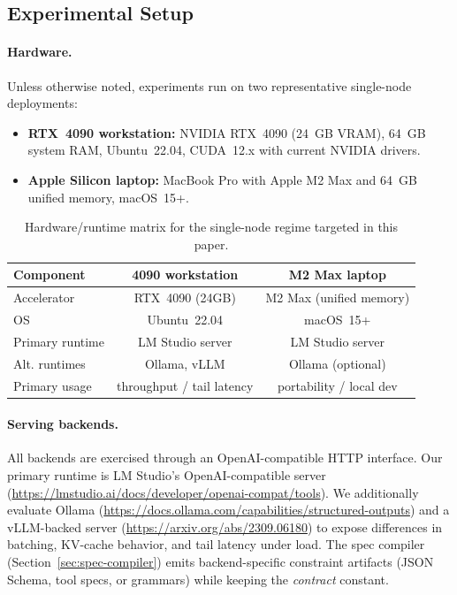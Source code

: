 \documentclass[11pt]{article}
\begin{document}
\subsection{Experimental Setup}
\label{sec:setup}

\paragraph{Hardware.}
Unless otherwise noted, experiments run on two representative single-node deployments:

\begin{itemize}[leftmargin=12pt]
    \item \textbf{RTX~4090 workstation:} NVIDIA RTX~4090 (24~GB VRAM), 64~GB system RAM, Ubuntu~22.04, CUDA~12.x with current NVIDIA drivers.
    \item \textbf{Apple Silicon laptop:} MacBook Pro with Apple M2 Max and 64~GB unified memory, macOS~15+.
\end{itemize}

\begin{table}[t]
\centering
\small
\begin{tabular}{@{}lcc@{}}
\toprule
\textbf{Component} & \textbf{4090 workstation} & \textbf{M2 Max laptop} \\
\midrule
Accelerator & RTX~4090 (24GB) & M2 Max (unified memory) \\
OS & Ubuntu~22.04 & macOS~15+ \\
Primary runtime & LM Studio server & LM Studio server \\
Alt. runtimes & Ollama, vLLM & Ollama (optional) \\
Primary usage & throughput / tail latency & portability / local dev \\
\bottomrule
\end{tabular}
\caption{Hardware/runtime matrix for the single-node regime targeted in this paper.}
\label{tab:hw-matrix}
\end{table}

\paragraph{Serving backends.}
All backends are exercised through an OpenAI-compatible HTTP interface.
Our primary runtime is LM Studio’s OpenAI-compatible server (\url{https://lmstudio.ai/docs/developer/openai-compat/tools}).
We additionally evaluate Ollama (\url{https://docs.ollama.com/capabilities/structured-outputs}) and a vLLM-backed server (\url{https://arxiv.org/abs/2309.06180}) to expose differences in batching, KV-cache behavior, and tail latency under load.
The spec compiler (Section~\ref{sec:spec-compiler}) emits backend-specific constraint artifacts (JSON Schema, tool specs, or grammars) while keeping the \emph{contract} constant.
\end{document}
